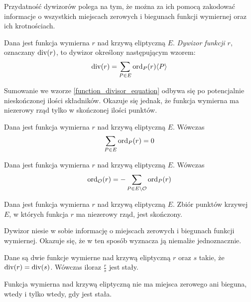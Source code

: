 Przydatność dywizorów polega na tym, że można za ich pomocą
zakodować informacje
o wszystkich miejscach zerowych i biegunach funkcji wymiernej
oraz ich krotnościach.

\begin{definition}
Dana jest funkcja wymierna $r$ nad krzywą eliptyczną $E$.
\emph{Dywizor funkcji $r$},
oznaczany $\operatorname{div}(r)$,
to dywizor określony następującym wzorem:
\begin{equation}\label{function_divisor_equation}
\operatorname{div}(r) = \sum_{P \in E} \operatorname{ord}_P(r)\langle P\rangle
\end{equation}
\end{definition}

Sumowanie we wzorze \ref{function_divisor_equation}
odbywa się po potencjalnie nieskończonej ilości składników.
Okazuje się jednak,
że funkcja wymierna ma niezerowy rząd
tylko w skończonej ilości punktów.

\begin{lemma}\label{function_order_sum_zero_lemma}
Dana jest funkcja wymierna $r$ nad krzywą eliptyczną $E$.
Wówczas
\begin{equation*}
\sum_{P \in E} \operatorname{ord}_P(r) = 0
\end{equation*}
\end{lemma}

\begin{corollary}
Dana jest funkcja wymierna $r$ nad krzywą eliptyczną $E$.
Wówczas
\begin{equation*}
\operatorname{ord}_{\mathcal{O}}(r) = -\sum_{P \in E \setminus \mathcal{O}} \operatorname{ord}_P(r)
\end{equation*}
\end{corollary}

\begin{corollary}
Dana jest funkcja wymierna $r$ nad krzywą eliptyczną $E$.
Zbiór punktów krzywej $E$,
w których funkcja $r$ ma niezerowy rząd,
jest skończony.
\end{corollary}

Dywizor niesie w sobie informację
o miejscach zerowych i biegunach funkcji wymiernej.
Okazuje się, że w ten sposób wyznacza ją niemalże jednoznacznie.

\begin{theorem}
Dane są dwie funkcje wymierne nad krzywą eliptyczną $r$ oraz $s$ takie,
że $\operatorname{div}(r) = \operatorname{div}(s)$.
Wówczas iloraz $\frac{r}{s}$ jest stały.
\end{theorem}

\begin{corollary}
Funkcja wymierna nad krzywą eliptyczną nie ma miejsca zerowego ani bieguna,
wtedy i tylko wtedy, gdy jest stała.
\end{corollary}

